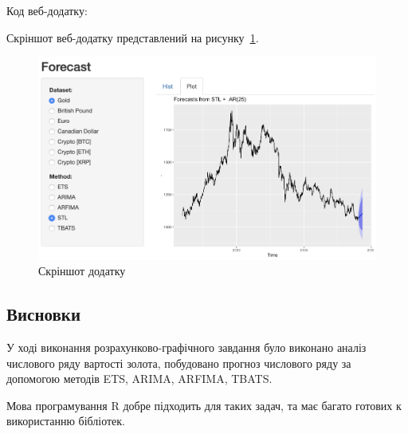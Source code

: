 Код веб-додатку:


Скріншот веб-додатку представлений на рисунку~\ref{fig:app_screen}.

\begin{figure}[H]
    \centering
        \includegraphics[width=1\textwidth]{app_screen}
    \caption{Скріншот додатку}
    \label{fig:app_screen}
\end{figure} 

\subsection*{Висновки}
У ході виконання розрахунково-графічного завдання було виконано аналіз числового ряду вартості золота, побудовано прогноз числового ряду за допомогою методів ETS, ARIMA, ARFIMA, TBATS. 

Мова програмування R добре підходить для таких задач, та має багато готових к використанню бібліотек. 


